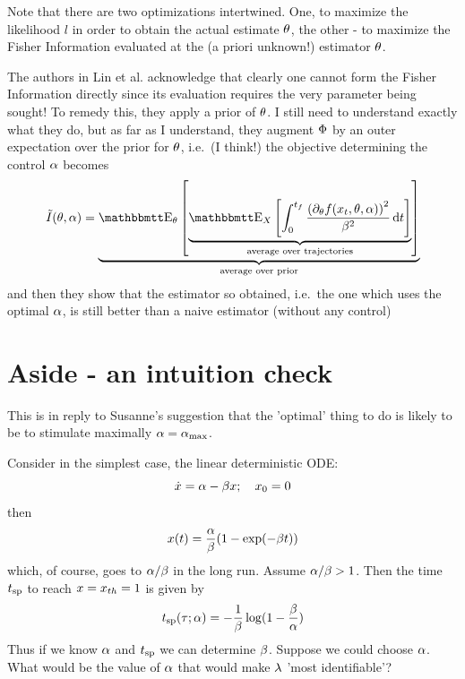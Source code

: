 \documentclass{article}
\begin{document}
Note that there are two optimizations intertwined. One, to maximize
the likelihood $l$ in order to obtain the actual estimate ${\theta}$, the other - to
maximize the Fisher Information evaluated at the (a priori unknown!) estimator ${\theta}$.

The authors in Lin et al. \cite{Lin} acknowledge that clearly one cannot form
the Fisher Information directly since its evaluation requires the very
parameter being sought! To remedy this, they apply a prior of ${\theta}$. I
still need to understand exactly what they do, but as far as I understand, they
augment ${\Phi}$ by an outer expectation over the prior for ${\theta}$, i.e.\ (I think!) 
the objective determining the control ${\alpha}$ becomes
\begin{equation}
\tilde{I}(\th, \a) = \underbrace{\Exp_\th \left [
\underbrace{\Exp_{X} \left[ \int_0^\tf
\frac{ \left( \di_\th f(x_t,\th, \a) \right)^2}{\b^2}
\intd{t}
\right]}_{\textrm{average over trajectories}}
\right]}_{\textrm{average over prior}}
\label{eq:Fisher_Information}
\end{equation}
and then they show that the estimator so obtained, i.e.\ the one which uses the
optimal ${\alpha}$, is still better than a naive estimator (without any control)

% 


\section{Aside - an intuition check}
\label{sec:alpha_crit_is_best_hypothesis}
This is in reply to Susanne's suggestion that the 'optimal' thing to do is
likely to be to stimulate maximally ${\alpha} = { {\alpha}_{\textrm{max}} }$. 

Consider in the simplest case, the linear deterministic ODE:
$$
\dot{x} = {\alpha} - {\beta}  x; \quad x_0 = 0
$$
then
$$
x(t) =  \frac{{\alpha}}{{\beta}} (1 - \exp(- {\beta} t))
$$
which, of course, goes to ${\alpha}/ {\beta}$ in the long run. 
Assume ${\alpha}/{\beta} > 1$. Then the time ${ t_{\textrm{sp} } }$ to reach $x = { x_{th} } = 1$
is given by
$$
{ t_{\textrm{sp} } } ({\tau}; {\alpha}) = -\frac 1{{\beta}}  \log( 1- \frac{{\beta}}{{\alpha} })
$$
Thus if we know
${\alpha}$ and ${ t_{\textrm{sp} } }$ we can determine ${\beta}$. Suppose we could choose ${\alpha}$. What would
be the value of ${\alpha}$ that would make ${\lambda}$ 'most identifiable'?
\end{document}
